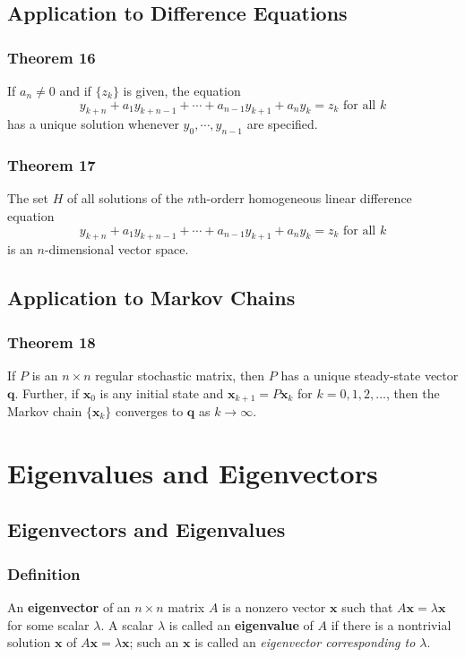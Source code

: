 \documentclass[letterpaper,11pt]{article}
\begin{document}
		\subsection{Application to Difference Equations}
			\subsubsection{Theorem 16}
				If $a_n\neq 0$ and if $\{z_k\}$ is given, the equation
				\begin{equation}
					y_{k+n}+a_1y_{k+n-1}+\cdots+a_{n-1}y_{k+1}+a_ny_k=z_k\textrm{  for all }k
				\end{equation}
				has a unique solution whenever $y_0,\cdots,y_{n-1}$ are specified.
			\subsubsection{Theorem 17}
				The set $H$ of all solutions of the $n$th-orderr homogeneous linear difference equation
				\begin{equation}
				y_{k+n}+a_1y_{k+n-1}+\cdots+a_{n-1}y_{k+1}+a_ny_k=z_k\textrm{  for all }k
				\end{equation}
				is an $n$-dimensional vector space.
		\subsection{Application to Markov Chains}
			\subsubsection{Theorem 18}
				If $P$ is an $n\times n$ regular stochastic matrix, then $P$ has a unique steady-state vector $\mathbf{q}$. Further, if $\mathbf{x}_0$ is any initial state and $\mathbf{x}_{k+1}=P\mathbf{x}_k$ for $k=0,1,2,\dots$, then the Markov chain $\{\mathbf{x}_k\}$ converges to $\mathbf{q}$ as $k\rightarrow\infty$.
	\section{Eigenvalues and Eigenvectors}
		\subsection{Eigenvectors and Eigenvalues}
			\subsubsection{Definition}
				An \textbf{eigenvector} of an $n\times n$ matrix $A$ is a nonzero vector $\mathbf{x}$ such that $A\mathbf{x}=\lambda\mathbf{x}$ for some scalar $\lambda$. A scalar $\lambda$ is called an \textbf{eigenvalue} of $A$ if there is a nontrivial solution $\mathbf{x}$ of $A\mathbf{x}=\lambda\mathbf{x}$; such an $\mathbf{x}$ is called an \textit{eigenvector corresponding to $\lambda$}.
\end{document}

